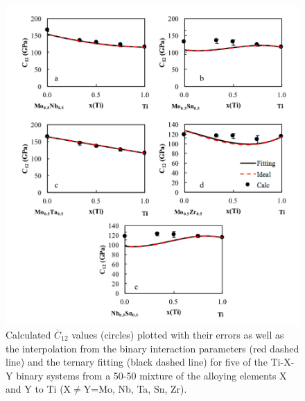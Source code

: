 \pagebreak
\begin{figure}[H]
	\centering
	\includegraphics[width=\textwidth]{Chapter-6/Figures/tixyc12_1.png}
	\caption{Calculated $\overline{C}_{12}$ values (circles) plotted with their errors as well as the interpolation from the binary interaction parameters (red dashed line) and the ternary fitting (black dashed line) for five of the Ti-X-Y binary systems from a 50-50 mixture of the alloying elements X and Y to Ti (X$\neq$Y=Mo, Nb, Ta, Sn, Zr).}
	\label{Ch6-figure:tixyc12_1}
\end{figure}

